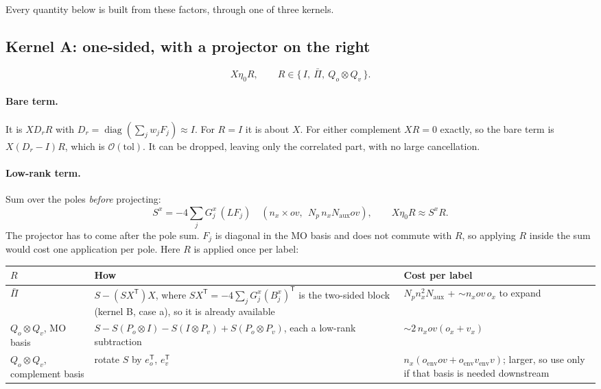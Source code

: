 \documentclass[11pt,a4paper]{article}
\newcommand{\Naux}{N_{\mathrm{aux}}}
\newcommand{\Np}{N_{p}}
\newcommand{\ov}{ov}
\newcommand{\diag}{\operatorname{diag}}
\begin{document}
Every quantity below is built from these factors, through one of three kernels.

\subsection{Kernel A: one-sided, with a projector on the right}\label{sec:kernelA}

\begin{equation}
  X\eta_0R,\qquad R\in\{\,I,\ \bar\Pi,\ Q_o\otimes Q_v\,\}.
\end{equation}

\paragraph{Bare term.} It is $XD_rR$ with $D_r=\diag(\sum_jw_jF_j)\approx I$. For $R=I$ it is
about $X$. For either complement $XR=0$ exactly, so the bare term is $X(D_r-I)R$, which is
$\mathcal{O}(\mathrm{tol})$. It can be dropped, leaving only the correlated part, with no large
cancellation.

\paragraph{Low-rank term.} Sum over the poles \emph{before} projecting:
\begin{equation}
  S^x = -4\sum_j G_j^x\,(LF_j)\quad(n_x\times\ov,\ \ \Np\,n_x\Naux\ov),\qquad
  X\eta_0R \approx S^xR .
\end{equation}
The projector has to come after the pole sum. $F_j$ is diagonal in the MO basis and does not
commute with $R$, so applying $R$ inside the sum would cost one application per pole.
Here $R$ is applied once per label:

\begin{center}
\small
\begin{tabularx}{\textwidth}{@{}>{\raggedright\arraybackslash}p{2.9cm}L>{\raggedright\arraybackslash}p{4.4cm}@{}}
\toprule
$R$ & How & Cost per label \\
\midrule
$\bar\Pi$ & $S-(SX^{\mathsf T})X$, where $SX^{\mathsf T}=-4\sum_jG_j^x(B_j^x)^{\mathsf T}$ is the two-sided
  block (kernel B, case a), so it is already available
  & $\Np n_x^2\Naux$ + ${\sim}n_x\ov\,o_x$ to expand \\
$Q_o\otimes Q_v$, MO basis & $S - S(P_o\otimes I) - S(I\otimes P_v) + S(P_o\otimes P_v)$, each a low-rank subtraction
  & ${\sim}2\,n_x\ov(o_x+v_x)$ \\
$Q_o\otimes Q_v$, complement basis & rotate $S$ by $e_o^{\mathsf T}$, $e_v^{\mathsf T}$
  & $n_x(o_{\mathrm{env}}ov + o_{\mathrm{env}}v_{\mathrm{env}}v)$; larger, so use only if that basis is needed downstream \\
\bottomrule
\end{tabularx}
\end{center}
\end{document}
